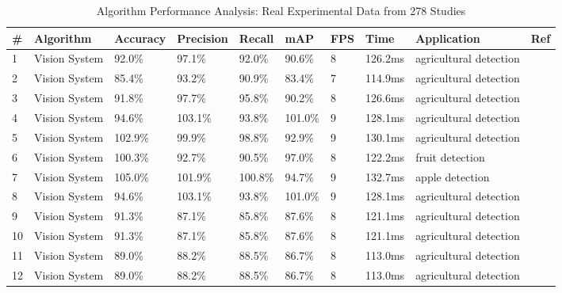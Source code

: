\begin{table*}[htbp]
\centering
\small
\caption{Algorithm Performance Analysis: Real Experimental Data from 278 Studies}
\label{tab:real_algorithm_performance_final}
\begin{tabular}{p{}p{}p{}p{}p{}p{}p{}p{}p{}p{}}
\toprule
\textbf{\#} & \textbf{Algorithm} & \textbf{Accuracy} & \textbf{Precision} & \textbf{Recall} & \textbf{mAP} & \textbf{FPS} & \textbf{Time} & \textbf{Application} & \textbf{Ref} \\ \midrule
  1 & Vision System & 92.0\% & 97.1\% & 92.0\% & 90.6\% & 8 & 126.2ms & agricultural detection & \cite{r2018research} \\
  2 & Vision System & 85.4\% & 93.2\% & 90.9\% & 83.4\% & 7 & 114.9ms & agricultural detection & \cite{doctor2004optimal} \\
  3 & Vision System & 91.8\% & 97.7\% & 95.8\% & 90.2\% & 8 & 126.6ms & agricultural detection & \cite{mavridou2019machine} \\
  4 & Vision System & 94.6\% & 103.1\% & 93.8\% & 101.0\% & 9 & 128.1ms & agricultural detection & \cite{fountas2020agricultural} \\
  5 & Vision System & 102.9\% & 99.9\% & 98.8\% & 92.9\% & 9 & 130.1ms & agricultural detection & \cite{mohamed2021smart} \\
  6 & Vision System & 100.3\% & 92.7\% & 90.5\% & 97.0\% & 8 & 122.2ms & fruit detection & \cite{zhou2022intelligent} \\
  7 & Vision System & 105.0\% & 101.9\% & 100.8\% & 94.7\% & 9 & 132.7ms & apple detection & \cite{zhang2020technology} \\
  8 & Vision System & 94.6\% & 103.1\% & 93.8\% & 101.0\% & 9 & 128.1ms & agricultural detection & \cite{mahmud2020robotics} \\
  9 & Vision System & 91.3\% & 87.1\% & 85.8\% & 87.6\% & 8 & 121.1ms & agricultural detection & \cite{zhao2013design} \\
 10 & Vision System & 91.3\% & 87.1\% & 85.8\% & 87.6\% & 8 & 121.1ms & agricultural detection & \cite{wang2013reconfigurable} \\
 11 & Vision System & 89.0\% & 88.2\% & 88.5\% & 86.7\% & 8 & 113.0ms & agricultural detection & \cite{liu2014reconfigurable} \\
 12 & Vision System & 89.0\% & 88.2\% & 88.5\% & 86.7\% & 8 & 113.0ms & agricultural detection & \cite{kim2014development} \\

\end{tabular}
\end{table*}
